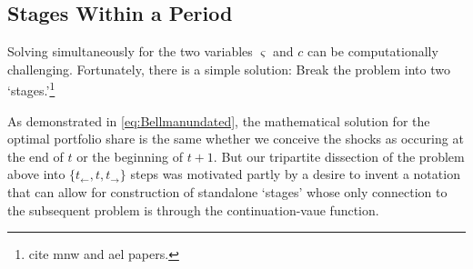 \hypertarget{stages-within-a-period}{}
\subsection{Stages Within a Period}\label{subsec:stageswithin}


Solving simultaneously for the two variables $\varsigma$ and ${c}$ can be computationally challenging.  Fortunately, there is a simple solution: Break the problem into two `stages.'\footnote{cite mnw and ael papers.}

As demonstrated in \eqref{eq:Bellmanundated}, the mathematical solution for the optimal portfolio share is the same whether we conceive the shocks as occuring at the end of $t$ or the beginning of $t+1.$  But our tripartite dissection of the problem above into $\{t_{\leftarrow},t,t_{\rightarrow}\}$ steps was motivated partly by a desire to invent a notation that can allow for construction of standalone `stages' whose only connection to the subsequent problem is through the continuation-vaue function.

